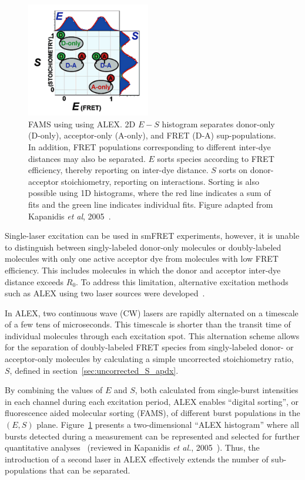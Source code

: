 \begin{figure}
    \centering
    \includegraphics[width=0.48\textwidth]{chapters/figures/FAMS.jpg}
    \caption{\label{fig:FAMS} 
    \ac{FAMS} using  using  \ac{ALEX}.  
    2D $E - S$ histogram separates donor-only (D-only),  acceptor-only (A-only), and FRET (D-A) sup-populations.  
    In addition, FRET populations corresponding to different inter-dye distances may also be separated. 
    $E$ sorts species according to FRET efficiency, thereby reporting on inter-dye distance. 
    $S$ sorts on donor-acceptor stoichiometry,  reporting  on  interactions.  Sorting  is  also  possible  using  1D  histograms, where the red line indicates a sum  of fits and the green line indicates individual fits. 
    Figure adapted from Kapanidis \textit{et al}, 2005~\cite{kapanidis_ACR_2005}.
    }
\end{figure}

Single-laser excitation can be used in \ac{smFRET} experiments, however, it is unable to distinguish between singly-labeled donor-only molecules or doubly-labeled molecules with only one active acceptor dye from molecules with low FRET efficiency. 
This includes molecules in which the donor and acceptor inter-dye distance exceeds $R_0$. 
To address this limitation, alternative excitation methods such as \ac{ALEX} using two laser sources were developed~\cite{kapanidis_PNAS_2004}.

In \ac{ALEX}, two continuous wave (\ac{CW}) lasers are rapidly alternated on a timescale of a few tens of microseconds. 
This timescale is shorter than the transit time of individual molecules through each excitation spot. 
This alternation scheme allows for the separation of doubly-labeled FRET species from singly-labeled donor- or acceptor-only molecules by calculating a simple uncorrected stoichiometry ratio, $S$, defined in section~\ref{sec:uncorrected_S_apdx}.

By combining the values of $E$ and $S$, both calculated from single-burst intensities in each channel during each excitation period, ALEX enables \enquote{digital sorting}, or fluorescence aided molecular sorting (\ac{FAMS}), of different burst populations in the $(E, S)$ plane.
Figure~\ref{fig:FAMS} presents a two-dimensional \enquote{ALEX histogram} where all bursts detected during a measurement can be represented and selected for further quantitative analyses~\cite{kapanidis_PNAS_2004,lee_BPJ_2005,laurence_PNAS_2005,muller_BJ_2005} (reviewed in Kapanidis \textit{et al.}, 2005~\cite{kapanidis_ACR_2005}).
Thus, the introduction of a second laser in \ac{ALEX} effectively extends the number of sub-populations that can be separated. 

